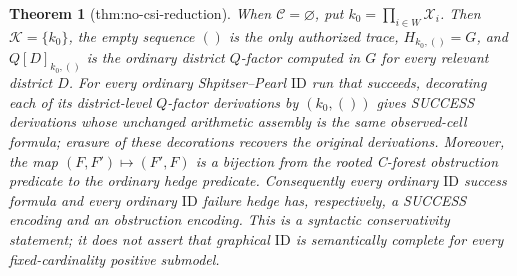 \documentclass{article}
\newtheorem{theorem}{Theorem}
\begin{document}
\begin{theorem}[thm:no-csi-reduction]\label{thm:no-csi-reduction}
When \(\mathcal C=\varnothing\), put \(k_0=\prod_{i\in W}\mathcal X_i\). Then \(\mathcal K=\{k_0\}\), the empty sequence \(()\) is the only authorized trace, \(H_{k_0,()}=G\), and \(Q[D]_{k_0,()}\) is the ordinary district \(Q\)-factor computed in \(G\) for every relevant district \(D\). For every ordinary Shpitser--Pearl \(\mathrm{ID}\) run that succeeds, decorating each of its district-level \(Q\)-factor derivations by \((k_0,())\) gives SUCCESS derivations whose unchanged arithmetic assembly is the same observed-cell formula; erasure of these decorations recovers the original derivations. Moreover, the map \((F,F')\mapsto(F',F)\) is a bijection from the rooted C-forest obstruction predicate to the ordinary hedge predicate. Consequently every ordinary \(\mathrm{ID}\) success formula and every ordinary \(\mathrm{ID}\) failure hedge has, respectively, a SUCCESS encoding and an obstruction encoding. This is a syntactic conservativity statement; it does not assert that graphical \(\mathrm{ID}\) is semantically complete for every fixed-cardinality positive submodel.
\end{theorem}
\end{document}
